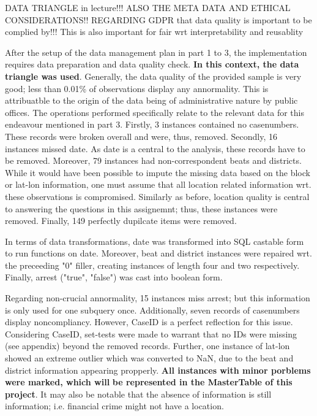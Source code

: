 \documentclass[a4paper]{article}
\begin{document}
DATA TRIANGLE in lecture!!!
ALSO THE META DATA AND ETHICAL CONSIDERATIONS!! REGARDING GDPR that data quality is important to be complied by!!! This is also important for fair wrt interpretability and reusablity


After the setup of the data management plan in part 1 to 3, the implementation requires data preparation and data quality check. \textbf{In this context, the data triangle was used}. Generally, the data quality of the provided sample is very good; less than 0.01\% of observations display any annormality. This is attribuatble to the origin of the data being of administrative nature by public offices.
\indent The operations performed specifically relate to the relevant data for this endeavour mentioned in part 3. Firstly, 3 instances contained no casenumbers. These records were broken overall and were, thus, removed. Secondly, 16 instances missed date. As date is a central to the analysis, these records have to be removed. Moreover, 79 instances had non-correspondent beats and districts. While it would have been possible to impute the missing data based on the block or lat-lon information, one must assume that all location related information wrt. these observations is compromised. Similarly as before, location quality is central to answering the questions in this assignemnt; thus, these instances were removed. Finally, 149 perfectly dupilcate items were removed. 

\indent In terms of data transformations, date was transformed into SQL castable form to run functions on date. Moreover, beat and district instances were repaired wrt. the preceeding "0" filler, creating instances of length four and two respectively. Finally, arrest ("true", "false") was cast into boolean form. 

\indent Regarding non-crucial annormality, 15 instances miss arrest; but this information is only used for one subquery once. Additionally, seven records of casenumbers display noncompliancy. However, CaseID is a perfect reflection for this issue. Considering CaseID, set-tests were made to warrant that no IDs were missing (see appendix) beyond the removed records. Further, one instance of lat-lon showed an extreme outlier which was converted to NaN, due to the beat and district information appearing propperly.\textbf{ All instances with minor porblems were marked, which will} \textbf{be represented in the MasterTable of this project}. It may also be notable that the absence of information is still information; i.e. financial crime might not have a location. 
\end{document}
